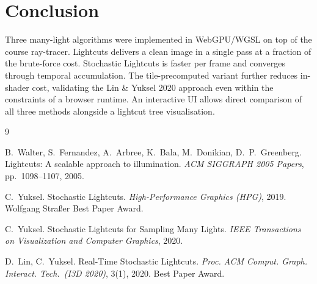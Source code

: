 \documentclass[10pt]{article}
\begin{document}
\section{Conclusion}

Three many-light algorithms were implemented in WebGPU/WGSL on top of the course
ray-tracer.
Lightcuts delivers a clean image in a single pass at a fraction of the brute-force
cost.
Stochastic Lightcuts is faster per frame and converges through temporal accumulation.
The tile-precomputed variant further reduces in-shader cost, validating the Lin \&
Yuksel 2020 approach even within the constraints of a browser runtime.
An interactive UI allows direct comparison of all three methods alongside a
lightcut tree visualisation.


\begin{thebibliography}{9}

B.~Walter, S.~Fernandez, A.~Arbree, K.~Bala, M.~Donikian, D.~P.~Greenberg.
\newblock Lightcuts: A scalable approach to illumination.
\newblock \textit{ACM SIGGRAPH 2005 Papers}, pp.~1098--1107, 2005.

C.~Yuksel.
\newblock Stochastic Lightcuts.
\newblock \textit{High-Performance Graphics (HPG)}, 2019.
\newblock Wolfgang Stra{\ss}er Best Paper Award.

C.~Yuksel.
\newblock Stochastic Lightcuts for Sampling Many Lights.
\newblock \textit{IEEE Transactions on Visualization and Computer Graphics}, 2020.

D.~Lin, C.~Yuksel.
\newblock Real-Time Stochastic Lightcuts.
\newblock \textit{Proc. ACM Comput. Graph. Interact. Tech.\ (I3D 2020)}, 3(1), 2020.
\newblock Best Paper Award.

\end{thebibliography}
\end{document}
